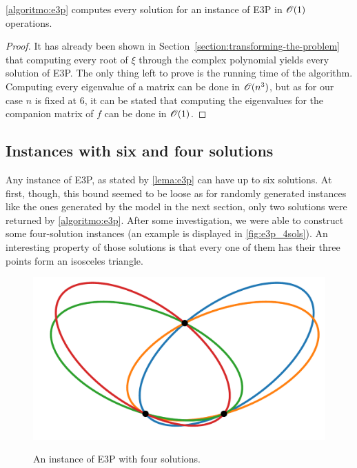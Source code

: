 \begin{theorem}\label{th:e3p}
	\autoref{algoritmo:e3p} computes every solution for an instance of E3P in $\mathscr{O}(1)$ operations.
\end{theorem}

\begin{proof}
	It has already been shown in Section~\ref{section:transforming-the-problem} that computing every root of $\xi$ through the complex polynomial yields every solution of E3P. The only thing left to prove is the running time of the algorithm.
	Computing every eigenvalue of a matrix can be done in $\mathscr{O}(n^3)$, but as for our case $n$ is fixed at $6$, it can be stated that computing the eigenvalues for the companion matrix of $f$ can be done in $\mathscr{O}(1)$.
\end{proof}

\subsection{Instances with six and four solutions}

Any instance of E3P, as stated by \autoref{lema:e3p} can have up to six solutions. At first, though, this bound seemed to be loose as for randomly generated instances like the ones generated by the model in the next section, only two solutions were returned by \autoref{algoritmo:e3p}.
After some investigation, we were able to construct some four-solution instances (an example is displayed in \autoref{fig:e3p_4sols}). An interesting property of those solutions is that every one of them has their three points form an isosceles triangle.

\begin{figure}[H]
	\centering
	\caption{An instance of E3P with four solutions.}
	\includegraphics[scale=.33]{tex/figures/e3p_4sols}
	\fautor
	\label{fig:e3p_4sols}
\end{figure}


